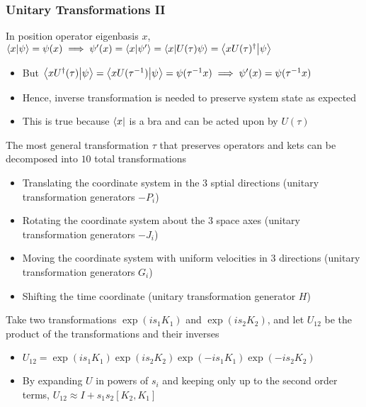 \documentclass[8pt,t,mathserif,aspectratio=169]{beamer}
\begin{document}
\begin{frame}
  \frametitle{Unitary Transformations II}
  \vspace{1mm}
  In position operator eigenbasis $x$, $\braket{x}{\psi} = \psi(x) \implies \psi'(x) = \braket{x}{\psi'} = \braket{x}{U(\tau)\psi} = \braket{xU(\tau)^{\dagger}}{\psi}$
  \begin{itemize}
    \item But $\braket{xU^{\dagger}(\tau)}{\psi} = \braket{xU(\tau^{-1})}{\psi} = \psi(\tau^{-1}x) \implies \psi'(x) = \psi(\tau^{-1}x)$ 
    \item Hence, inverse transformation is needed to preserve system state as expected
    \item This is true because $\bra{x}$ is a bra and can be acted upon by $U(\tau)$
  \end{itemize}
  The most general transformation $\tau$ that preserves operators and kets can be decomposed into $10$ total transformations
  \begin{itemize}
    \item Translating the coordinate system in the $3$ sptial directions (unitary transformation generators $-P_i$)
    \item Rotating the coordinate system about the $3$ space axes (unitary transformation generators $-J_i$)
    \item Moving the coordinate system with uniform velocities in $3$ directions (unitary transformation generators $G_i$)
    \item Shifting the time coordinate (unitary transformation generator $H$)
  \end{itemize}
  Take two transformations $\exp(i s_1 K_1)$ and $\exp(i s_2 K_2)$, and let $U_{12}$ be the product of the transformations and their inverses
  \begin{itemize}
    \item $U_{12} = \exp(i s_1 K_1) \exp(i s_2 K_2) \exp(-i s_1 K_1) \exp(-i s_2 K_2)$
    \item By expanding $U$ in powers of $s_i$ and keeping only up to the second order terms, $U_{12} \approx I + s_1 s_2 [K_2,K_1]$
  \end{itemize}
\end{frame}
\end{document}
